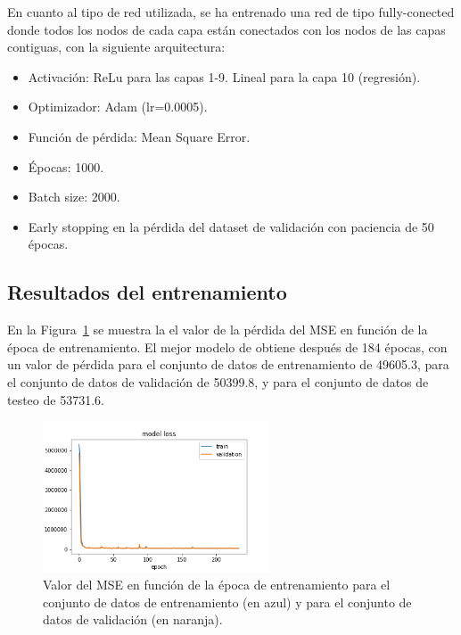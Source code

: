 En cuanto al tipo de red utilizada, se ha entrenado una red de tipo fully-conected donde todos los nodos de cada capa est\'an conectados con los nodos de las capas contiguas, con la siguiente arquitectura:


\begin{itemize}

\item Activaci\'on: ReLu para las capas 1-9. Lineal para la capa 10 (regresi\'on).

\item Optimizador: Adam (lr=0.0005).

\item Funci\'on de p\'erdida: Mean Square Error.

\item \'Epocas: 1000.

\item Batch size: 2000.

\item Early stopping en la p\'erdida del dataset de validaci\'on con paciencia de 50 \'epocas.

\end{itemize}


\subsection{Resultados del entrenamiento}\label{sec:trainresults}

En la Figura~\ref{fig:model_loss} se muestra la el valor de la p\'erdida del MSE en funci\'on de la \'epoca de entrenamiento. El mejor modelo de obtiene despu\'es de 184 \'epocas, con un valor de p\'erdida para el conjunto de datos de entrenamiento de 49605.3, para el conjunto de datos de validaci\'on de 50399.8, y para el conjunto de datos de testeo de 53731.6.  \\

\begin{figure}[h]
\centering
\includegraphics[width=0.6\textwidth]{figures/model_loss.png}
\caption{Valor del MSE en funci\'on de la \'epoca de entrenamiento para el conjunto de datos de entrenamiento (en azul) y para el conjunto de datos de validaci\'on (en naranja).}
\label{fig:model_loss}        
\end{figure}


